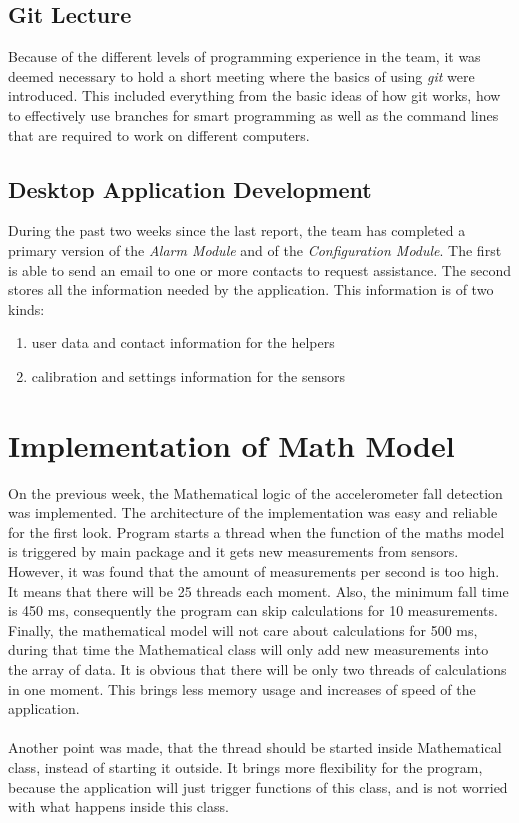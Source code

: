\documentclass[12pt]{article}
\begin{document}
\subsection{Git Lecture}
Because of the different levels of programming experience in the team, it was deemed necessary to hold a short meeting where the basics of using \textit{git} were introduced. This included everything from the basic ideas of how git works, how to effectively use branches for smart programming as well as the command lines that are required to work on different computers.

\subsection{Desktop Application Development}
During the past two weeks since the last report, the team has completed a primary version of the \textit{Alarm Module} and of the \textit{Configuration Module}. The first is able to send an email to one or more contacts to request assistance. The second stores all the information needed by the application. This information is of two kinds:  
\begin{enumerate}
	\item user data and contact information for the helpers
	\item calibration and settings information for the sensors
\end{enumerate}

\section{Implementation of Math Model}
On the previous week, the Mathematical logic of the accelerometer fall detection was implemented. The architecture of the implementation was easy and reliable for the first look. Program starts a thread when the function of the maths model is triggered by main package and it gets new measurements from sensors. However, it was found that the amount of measurements per second is too high. It means that there will be 25 threads each moment. Also, the minimum fall time is 450 ms, consequently the program can skip calculations for 10 measurements. Finally, the mathematical model will not care about calculations for 500 ms, during that time the Mathematical class will only add new measurements into the array of data. It is obvious that there will be only two threads of calculations in one moment. This brings less memory usage and increases of speed of the application.\\\\
Another point was made, that the thread should be started inside Mathematical class, instead of starting it outside. It brings more flexibility for the program, because the application will just trigger functions of this class, and is not worried with what happens inside this class.
\end{document}
